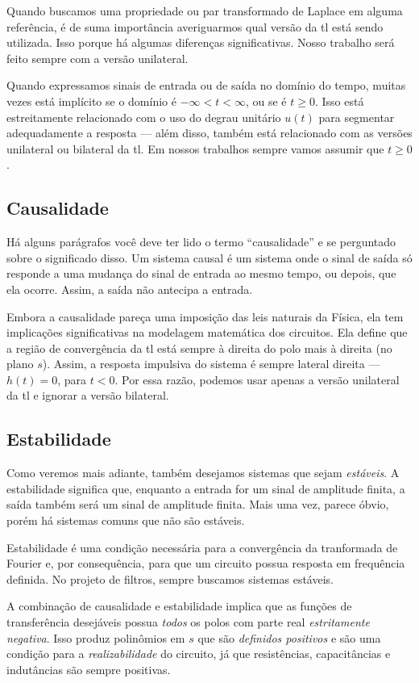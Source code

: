 Quando buscamos uma propriedade ou par transformado de Laplace em alguma referência, é de suma importância averiguarmos qual versão da \ac{tl} está sendo utilizada. Isso porque há algumas diferenças significativas. Nosso trabalho será feito sempre com a versão unilateral.

Quando expressamos sinais de entrada ou de saída no domínio do tempo, muitas vezes está implícito se o domínio é $-\infty<t<\infty$, ou se é $t\geq0$. Isso está estreitamente relacionado com o uso do degrau unitário $u(t)$ para segmentar adequadamente a resposta --- além disso, também está relacionado com as versões unilateral ou bilateral da \ac{tl}. Em nossos trabalhos sempre vamos assumir que $t\geq0$.

\subsection{Causalidade}

Há alguns parágrafos você deve ter lido o termo \enquote{causalidade} e se perguntado sobre o significado disso. Um sistema causal é um sistema onde o sinal de saída só responde a uma mudança do sinal de entrada ao mesmo tempo, ou depois, que ela ocorre. Assim, a saída não antecipa a entrada.

Embora a causalidade pareça uma imposição das leis naturais da Física, ela tem implicações significativas na modelagem matemática dos circuitos. Ela define que a região de convergência da \ac{tl} está sempre à direita do polo mais à direita (no plano $s$). Assim, a resposta impulsiva do sistema é sempre lateral direita --- $h(t)=0$, para $t<0$. Por essa razão, podemos usar apenas a versão unilateral da \ac{tl} e ignorar a versão bilateral.

\subsection{Estabilidade}

Como veremos mais adiante, também desejamos sistemas que sejam \emph{estáveis}. A estabilidade significa que, enquanto a entrada for um sinal de amplitude finita, a saída também será um sinal de amplitude finita. Mais uma vez, parece óbvio, porém há sistemas comuns que não são estáveis.

Estabilidade é uma condição necessária para a convergência da tranformada de Fourier e, por consequência, para que um circuito possua resposta em frequência definida. No projeto de filtros, sempre buscamos sistemas estáveis.

A combinação de causalidade e estabilidade implica que as funções de transferência desejáveis possua \emph{todos} os polos com parte real \emph{estritamente negativa}. Isso produz polinômios em $s$ que são \emph{definidos positivos} e são uma condição para a \emph{realizabilidade} do circuito, já que resistências, capacitâncias e indutâncias são sempre positivas.

